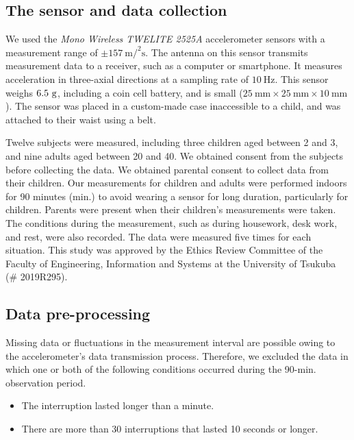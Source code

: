 \documentclass{bmcart}
\begin{document}
\subsection{The sensor and data collection}
We used the \textit{Mono Wireless TWELITE 2525A} accelerometer sensors with a measurement range of $\pm 157~\si{\metre\square\per\second}$. 
The antenna on this sensor transmits measurement data to a receiver, such as a computer or smartphone. It measures acceleration in three-axial directions at a sampling rate of $10~\si{\hertz}$. This sensor weighs $6.5~\rm{g}$, including a coin cell battery, and is small ($25~\si{\milli\metre}\times25~\si{\milli\metre}\times10~\si{\milli\metre}$). %
The sensor was placed in a custom-made case inaccessible to a child, and was attached to their waist using a belt.

Twelve subjects were measured, including three children aged between 2 and 3, and nine adults aged between 20 and 40. We obtained consent from the subjects before collecting the data. We obtained parental consent to collect data from their children. Our measurements for children and adults were performed indoors for 90 minutes (min.) to avoid wearing a sensor for long duration, particularly for children. Parents were present when their children's measurements were taken. The conditions during the measurement, such as during housework, desk work, and rest, were also recorded. The data were measured  five times for each situation. This study was approved by the Ethics Review Committee of the Faculty of Engineering, Information and Systems at the University of Tsukuba (\# 2019R295).

\subsection{Data pre-processing}
Missing data or ﬂuctuations in the measurement interval are possible owing to the accelerometer's data transmission process. Therefore, we excluded the data in which one or both of the following conditions occurred during the 90-min. observation period.
\begin{itemize}
    \item The interruption lasted longer than a minute.
    \item There are more than 30 interruptions that lasted 10 seconds or longer.
\end{itemize}
\end{document}
